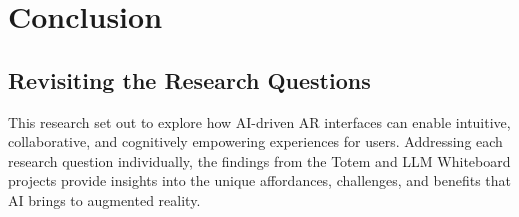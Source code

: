 \section{Conclusion}

\subsection{Revisiting the Research Questions}
This research set out to explore how AI-driven AR interfaces can enable intuitive, collaborative, and cognitively empowering experiences for users.
Addressing each research question individually, the findings from the Totem and LLM Whiteboard projects provide insights into the unique affordances, challenges, and benefits that AI brings to augmented reality.

    
    
